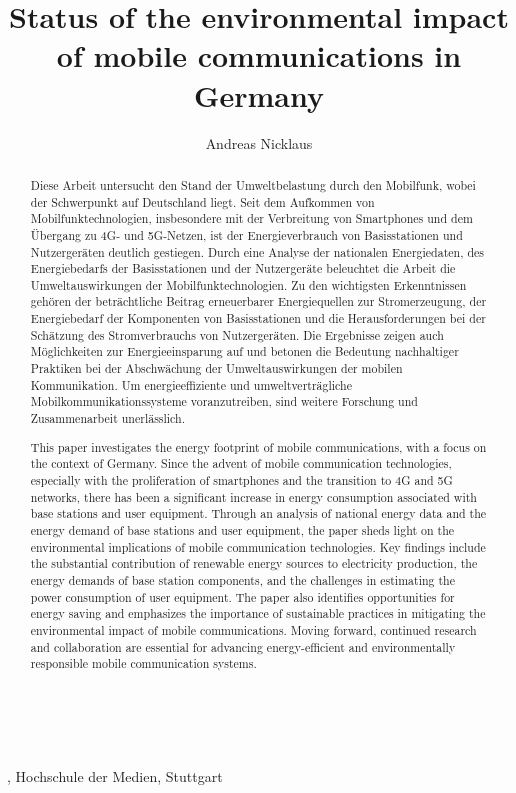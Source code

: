 \documentclass[11pt,a4paper]{article}
\title{Status of the environmental impact of mobile communications in Germany}
\author{Andreas Nicklaus}
\makeatletter
\renewcommand\maketitle{
{\raggedright
\begin{center}
{\Large \bfseries \@title}\\[2ex] 
\@author\\[1ex] 
\@date, Hochschule der Medien, Stuttgart\\[1ex]
\end{center}}}
\makeatother
\begin{document}
\maketitle

\begin{abstract}
  Diese Arbeit untersucht den Stand der Umweltbelastung durch den Mobilfunk, wobei der Schwerpunkt auf Deutschland liegt.
  Seit dem Aufkommen von Mobilfunktechnologien, insbesondere mit der Verbreitung von Smartphones und dem Übergang zu 4G- und 5G-Netzen, ist der Energieverbrauch von Basisstationen und Nutzergeräten deutlich gestiegen.
  Durch eine Analyse der nationalen Energiedaten, des Energiebedarfs der Basisstationen und der Nutzergeräte beleuchtet die Arbeit die Umweltauswirkungen der Mobilfunktechnologien.
  Zu den wichtigsten Erkenntnissen gehören der beträchtliche Beitrag erneuerbarer Energiequellen zur Stromerzeugung, der Energiebedarf der Komponenten von Basisstationen und die Herausforderungen bei der Schätzung des Stromverbrauchs von Nutzergeräten.
  Die Ergebnisse zeigen auch Möglichkeiten zur Energieeinsparung auf und betonen die Bedeutung nachhaltiger Praktiken bei der Abschwächung der Umweltauswirkungen der mobilen Kommunikation.
  Um energieeffiziente und umweltverträgliche Mobilkommunikationssysteme voranzutreiben, sind weitere Forschung und Zusammenarbeit unerlässlich.
\end{abstract}

\begin{abstract}
  This paper investigates the energy footprint of mobile communications, with a focus on the context of Germany.
  Since the advent of mobile communication technologies, especially with the proliferation of smartphones and the transition to 4G and 5G networks, there has been a significant increase in energy consumption associated with base stations and user equipment.
  Through an analysis of national energy data and the energy demand of base stations and user equipment, the paper sheds light on the environmental implications of mobile communication technologies.
  Key findings include the substantial contribution of renewable energy sources to electricity production, the energy demands of base station components, and the challenges in estimating the power consumption of user equipment.
  The paper also identifies opportunities for energy saving and emphasizes the importance of sustainable practices in mitigating the environmental impact of mobile communications.
  Moving forward, continued research and collaboration are essential for advancing energy-efficient and environmentally responsible mobile communication systems.
\end{abstract}
\end{document}
